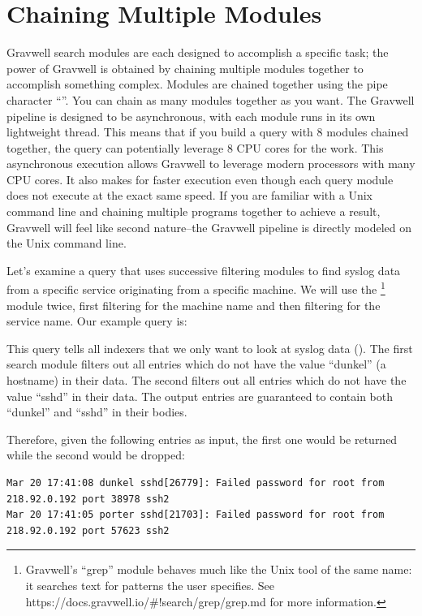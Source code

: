 \section{Chaining Multiple Modules}

Gravwell search modules are each designed to accomplish a specific
task; the power of Gravwell is obtained by chaining multiple modules
together to accomplish something complex. Modules are chained together
using the pipe character ``\textbar{}''. You can chain as many modules
together as you want. The Gravwell pipeline is designed to be
asynchronous, with each module runs in its own lightweight thread. This
means that if you build a query with 8 modules chained together, the
query can potentially leverage 8 CPU cores for the work. This
asynchronous execution allows Gravwell to leverage modern processors
with many CPU cores. It also makes for faster execution even though each
query module does not execute at the exact same speed. If you are
familiar with a Unix command line and chaining multiple programs
together to achieve a result, Gravwell will feel like second
nature--the Gravwell pipeline is directly modeled on the Unix command
line.

Let's examine a query that uses successive filtering modules to find
syslog data from a specific service originating from a specific machine.
We will use the
\footnote{Gravwell's ``grep'' module behaves much like the Unix tool of the same name: it searches text for patterns the user specifies. See https://docs.gravwell.io/\#!search/grep/grep.md for more information.} module
twice, first filtering for the machine name and then filtering for the
service name. Our example query is:


This query tells all indexers that we only want to look at syslog
data (). The first  search module filters out all entries which do not
have the value ``dunkel'' (a hostname) in their data. The second  filters out all
entries which do not have the value ``sshd'' in their data. The output
entries are guaranteed to contain both ``dunkel'' and ``sshd'' in their
bodies.

Therefore, given the following entries as input, the first one would be returned while the second would be dropped:

\begin{Verbatim}[breaklines=true]
Mar 20 17:41:08 dunkel sshd[26779]: Failed password for root from 218.92.0.192 port 38978 ssh2
Mar 20 17:41:05 porter sshd[21703]: Failed password for root from 218.92.0.192 port 57623 ssh2
\end{Verbatim}

